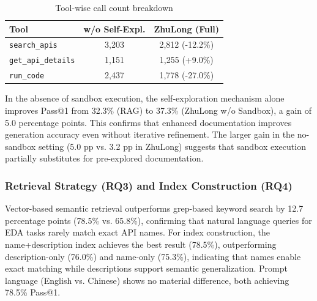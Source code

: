 \documentclass[anonymous, sigconf]{acmart}
\begin{document}
\begin{table}[htbp]
\centering
\caption{Tool-wise call count breakdown}
\label{tab:tool-breakdown}
\begin{tabular}{lcc}
\toprule
\textbf{Tool} & \textbf{w/o Self-Expl.} & \textbf{ZhuLong (Full)} \\
\midrule
\texttt{search\_apis} & 3,203 & 2,812 (-12.2\%) \\
\texttt{get\_api\_details} & 1,151 & 1,255 (+9.0\%) \\
\texttt{run\_code} & 2,437 & 1,778 (-27.0\%) \\
\bottomrule
\end{tabular}
\end{table}

In the absence of sandbox execution, the self-exploration mechanism alone improves Pass@1 from 32.3\% (RAG) to 37.3\% (ZhuLong w/o Sandbox), a gain of 5.0 percentage points. This confirms that enhanced documentation improves generation accuracy even without iterative refinement. The larger gain in the no-sandbox setting (5.0 pp vs. 3.2 pp in ZhuLong) suggests that sandbox execution partially substitutes for pre-explored documentation.

\subsubsection{Retrieval Strategy (RQ3) and Index Construction (RQ4)}

Vector-based semantic retrieval outperforms grep-based keyword search by 12.7 percentage points (78.5\% vs. 65.8\%), confirming that natural language queries for EDA tasks rarely match exact API names. For index construction, the name+description index achieves the best result (78.5\%), outperforming description-only (76.0\%) and name-only (75.3\%), indicating that names enable exact matching while descriptions support semantic generalization. Prompt language (English vs. Chinese) shows no material difference, both achieving 78.5\% Pass@1.
\end{document}

